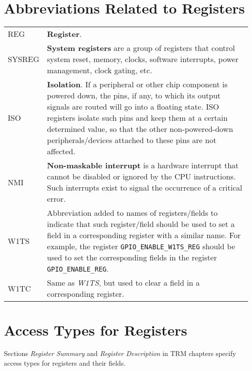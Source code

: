 
\section*{Abbreviations Related to Registers}\label{glossary-abbr-reg}

\begin{longtable}[c]{ R{3cm} p{12cm} }

REG     & \textbf{Register}. \\
SYSREG  & \textbf{System registers} are a group of registers that control system reset, memory, clocks, software interrupts, power management, clock gating, etc. \\
ISO     & \textbf{Isolation}. If a peripheral or other chip component is powered down, the pins, if any, to which its output signals are routed will go into a floating state. ISO registers isolate such pins and keep them at a certain determined value, so that the other non-powered-down peripherals/devices attached to these pins are not affected. \\
NMI     & \textbf{Non-maskable interrupt} is a hardware interrupt that cannot be disabled or ignored by the CPU instructions. Such interrupts exist to signal the occurrence of a critical error. \\
W1TS    & Abbreviation added to names of registers/fields to indicate that such register/field should be used to set a field in a corresponding register with a similar name. For example, the register \texttt{GPIO\_ENABLE\_W1TS\_REG} should be used to set the corresponding fields in the register \texttt{GPIO\_ENABLE\_REG}. \\
W1TC    & Same as \textit{W1TS}, but used to clear a field in a corresponding register. \\

\end{longtable}



{}
\section*{Access Types for Registers}\label{glossary-access-types}

Sections \textit{Register Summary} and \textit{Register Description} in TRM chapters specify access types for registers and their fields.

